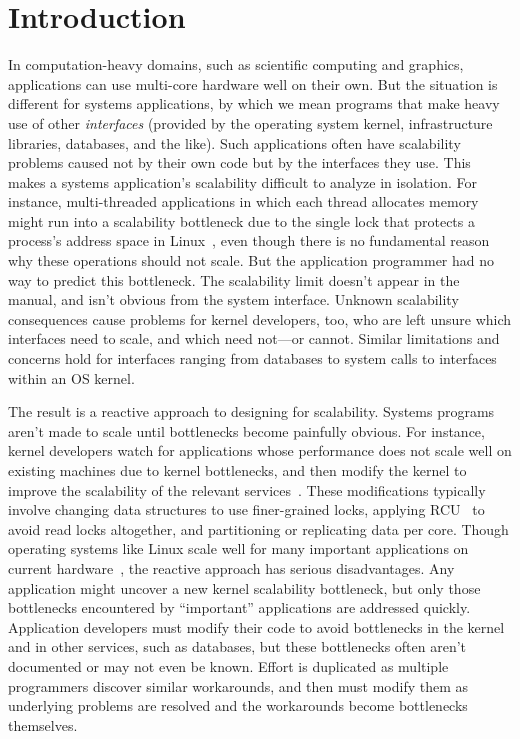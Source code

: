\section{Introduction}
\label{sec:intro}

In computation-heavy domains, such as scientific computing and
graphics, applications can use multi-core hardware well on their own.
%
But the situation is different for systems applications, by which we
mean programs that make heavy use of other \emph{interfaces} (provided
by the operating system kernel, infrastructure libraries, databases, and
the like).
%
Such applications often have scalability problems caused not
by their own code but by the interfaces they use.
%
This makes a systems application's scalability difficult to analyze in
isolation.
%
For instance, multi-threaded applications
in which each thread allocates memory
might run into a scalability bottleneck due to the single lock that protects
a process's address space in Linux~\cite{clements:bonsai}, even though there
is no fundamental reason why these operations should not scale.
%
But the application programmer had no way to predict this bottleneck.
%
The scalability limit doesn't appear in the manual, and isn't obvious
from the system interface.
%
Unknown scalability consequences cause problems for kernel developers, too,
who are left unsure which interfaces need to scale, and which need
not---or cannot.
%
Similar limitations and concerns hold for interfaces ranging from
databases to system calls to interfaces within an OS kernel.

The result is a reactive approach to designing for scalability.
%
Systems programs aren't made to scale until bottlenecks become
painfully obvious.
%
For instance, kernel developers watch for applications
whose performance does not scale well on existing machines due to kernel
bottlenecks, and then modify the kernel to improve the scalability of the
relevant services~\cite{cacm-real-world}.  These modifications typically
involve changing data structures to use finer-grained locks, applying
RCU~\cite{rcu:linux} to avoid read locks altogether, and partitioning or
replicating data per core.
%
Though operating systems like Linux scale well for many important applications on current
hardware~\cite{boyd-wickizer:scaling},
%
the reactive approach has serious disadvantages.
%
Any application might uncover a new kernel scalability bottleneck,
but only those bottlenecks encountered by ``important'' applications
are addressed quickly.
%
Application developers must modify their code to avoid bottlenecks in
the kernel and in other services, such as databases, but these
bottlenecks often aren't documented or may not even be known.
%
Effort is duplicated as multiple programmers discover similar
workarounds, and then must modify them as underlying problems are
resolved and the workarounds become bottlenecks themselves.

